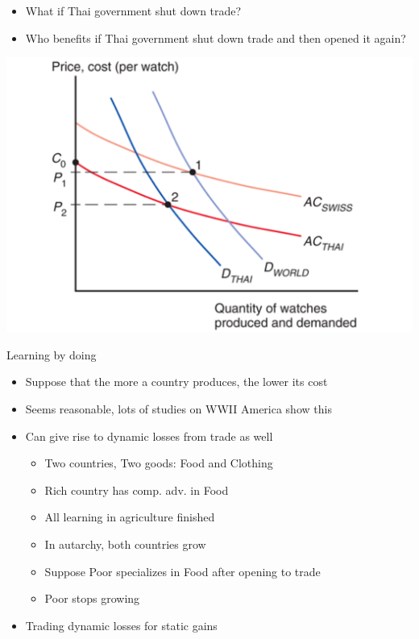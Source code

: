 \documentclass[ignorenonframetext,]{beamer}
\begin{document}
\begin{frame}

    \begin{itemize}
        \item What if Thai government shut down trade?
        \item Who benefits if Thai government shut down trade and then opened it again?
    \end{itemize}
    \includegraphics[scale=0.20]{lossesfromtrade.png}

\end{frame}

\begin{frame}{Learning by doing}

    \begin{itemize}
        \item Suppose that the more a country produces, the lower its cost 
        \item Seems reasonable, lots of studies on WWII America show this
        \item Can give rise to dynamic losses from trade as well
        \begin{itemize}
            \item Two countries, Two goods: Food and Clothing
            \item Rich country has comp. adv. in Food
            \item All learning in agriculture finished
            \item In autarchy, both countries grow 
            \item Suppose Poor specializes in Food after opening to trade
            \item Poor stops growing
        \end{itemize}
        \item Trading dynamic losses for static gains
    \end{itemize}

\end{frame}
\end{document}
